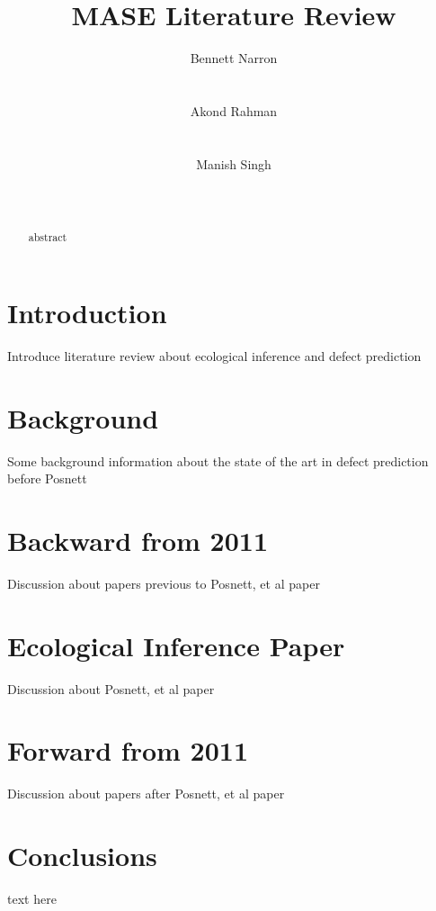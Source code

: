 \documentclass{sig-alternate-05-2015}
\begin{document}
    
\title{ MASE Literature Review }


\author{
\alignauthor
Bennett Narron\\
       \\
       \\
\alignauthor
Akond Rahman\\
       \\
       \\
\alignauthor
Manish Singh\\
       \\
       \\
}

\maketitle

\begin{abstract}
abstract
\end{abstract}


\section{Introduction}
Introduce literature review about ecological inference and defect prediction

\section{Background}
Some background information about the state of the art in defect prediction before Posnett

\section{Backward from 2011}
Discussion about papers previous to Posnett, et al paper

\section{Ecological Inference Paper}
Discussion about Posnett, et al paper

\section{Forward from 2011}
Discussion about papers after Posnett, et al paper

\section{Conclusions}
text here




\end{document}
